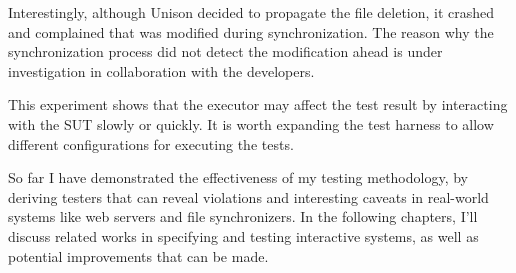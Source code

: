 Interestingly, although Unison decided to propagate the file deletion, it
crashed and complained that  was modified during synchronization.
The reason why the synchronization process did not detect the modification ahead
is under investigation in collaboration with the developers.

This experiment shows that the executor may affect the test result by
interacting with the SUT slowly or quickly.  It is worth expanding the test
harness to allow different configurations for executing the tests.

So far I have demonstrated the effectiveness of my testing methodology, by
deriving testers that can reveal violations and interesting caveats in
real-world systems like web servers and file synchronizers.  In the following
chapters, I'll discuss related works in specifying and testing interactive
systems, as well as potential improvements that can be made.
